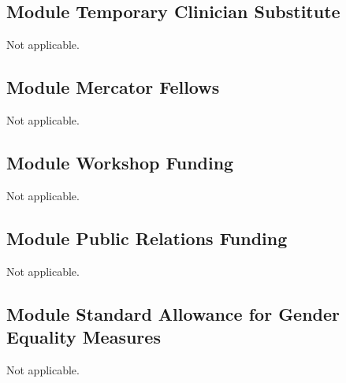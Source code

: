 \documentclass[a4paper,11pt,headings=normal]{scrartcl}
\begin{document}
\subsection{Module Temporary Clinician Substitute}
Not applicable. 

\subsection{Module Mercator Fellows}
Not applicable. 

\subsection{Module Workshop Funding}
Not applicable. 

\subsection{Module Public Relations Funding}
Not applicable. 

\subsection{Module Standard Allowance for Gender Equality Measures}
Not applicable. 
\end{document}
